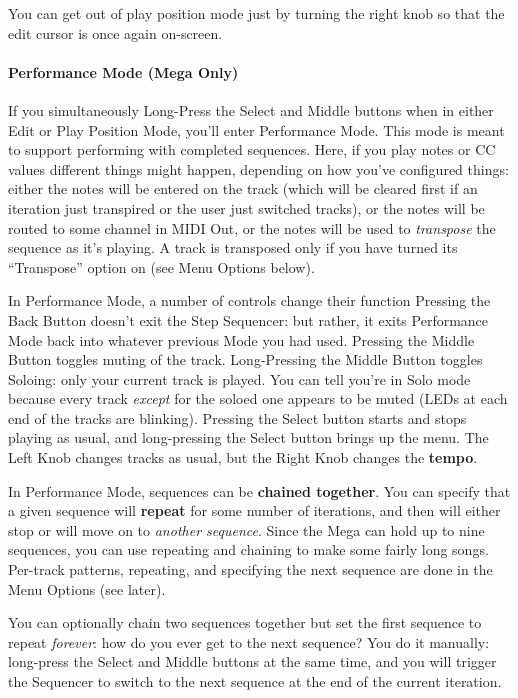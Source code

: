 \documentclass{article}
\begin{document}
You can get out of play position mode just by turning the right knob so that the edit cursor is once again on-screen.

\paragraph{Performance Mode {\rm (Mega Only)}} If you simultaneously Long-Press the Select and Middle buttons when in either Edit or Play Position Mode, you'll enter Performance Mode.  This mode is meant to support performing with completed sequences.  Here, if you play notes or CC values different things might happen, depending on how you've configured things: either the notes will be entered on the track (which will be cleared first if an iteration just transpired or the user just switched tracks), or the notes will be routed to some channel in MIDI Out, or the notes will be used to {\it transpose} the sequence as it's playing.  A track is transposed only if you have turned its ``Transpose'' option on (see Menu Options below).

In Performance Mode, a number of controls change their function  Pressing the Back Button doesn't exit the Step Sequencer: but rather, it exits Performance Mode back into whatever previous Mode you had used.  Pressing the Middle Button toggles muting of  the track.  Long-Pressing the Middle Button toggles Soloing: only your current track is played.  You can tell you're in Solo mode because every track {\it except} for the soloed one appears to be muted (LEDs at each end of the tracks are blinking).  Pressing the Select button starts and stops playing as usual, and long-pressing the Select button brings up the menu.  The Left Knob changes tracks as usual, but the Right Knob changes the {\bf tempo}.

In Performance Mode, sequences can be {\bf chained together}.  You can specify that a given sequence will {\bf repeat} for some number of iterations, and then will either stop or will move on to {\it another sequence}.  Since the Mega can hold up to nine sequences, you can use repeating and chaining to make some fairly long songs.  Per-track patterns, repeating, and specifying the next sequence are done in the Menu Options (see later).

You can optionally chain two sequences together but set the first sequence to repeat {\it forever}: how do you ever get to the next sequence?  You do it manually: long-press the Select and Middle buttons at the same time, and you will trigger the Sequencer to switch to the next sequence at the end of the current iteration.
\end{document}

